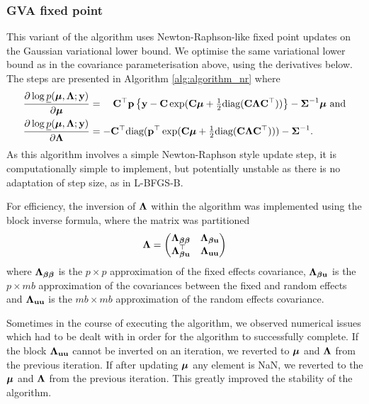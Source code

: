 	\subsubsection{GVA fixed point} 	%
	This variant of the algorithm uses Newton-Raphson-like fixed point updates on the Gaussian variational lower
	bound. We optimise the same variational lower bound as in the covariance parameterisation above, using the
	derivatives below. The steps are presented in Algorithm \ref{alg:algorithm_nr} where	
	\begin{align*}
		\frac{\partial \log \underline{p}({\boldsymbol \mu}, {\boldsymbol \Lambda}; {\bf y})}{\partial {\boldsymbol\mu}}     & = \quad {\bf C}^\top{\bf p} \left \{{\bf y} - {\bf C}\exp({\bf C} {\boldsymbol \mu} + \tfrac{1}{2} \text{diag}({\bf C} {\boldsymbol \Lambda} {\bf C}^\top)) \right \} - {\boldsymbol \Sigma}^{-1} {\boldsymbol \mu} \text{ and} \\
		\frac{\partial \log \underline{p}({\boldsymbol \mu}, {\boldsymbol \Lambda}; {\bf y})}{\partial {\boldsymbol\Lambda}} & = -{\bf C}^\top \text{diag}({\bf p}^\top \exp({\bf C} {\boldsymbol \mu} +\tfrac{1}{2} \text{diag}({\bf C} {\boldsymbol \Lambda} {\bf C}^\top))) - {\boldsymbol \Sigma}^{-1}.                             
	\end{align*}
	As this algorithm involves a simple Newton-Raphson style update step, it is computationally simple to
	implement, but potentially unstable as there is no adaptation of step size, as in L-BFGS-B.

	For efficiency, the inversion of ${\boldsymbol \Lambda}$ within the algorithm was implemented using the block inverse 
	formula, where	the matrix was partitioned
	\[
		{\boldsymbol \Lambda} =
		\begin{pmatrix}
			{\boldsymbol\Lambda}_{{\boldsymbol \beta} {\boldsymbol \beta}} & {\boldsymbol \Lambda}_{{\boldsymbol \beta} {\bf u}} \\
			{\boldsymbol \Lambda}_{{\boldsymbol \beta} {\bf u}}^\top & {\boldsymbol \Lambda}_{{\bf u} {\bf u}}
		\end{pmatrix}
	\]
	where ${\boldsymbol \Lambda}_{{\boldsymbol \beta} {\boldsymbol \beta}}$ is the $p \times p$ approximation of the fixed effects covariance, ${\boldsymbol \Lambda}_{{\boldsymbol \beta} {\bf u}}$ is the $p \times mb$
	approximation of the covariances between the fixed and random effects and ${\boldsymbol \Lambda}_{{\bf u} {\bf u}}$ is the $mb \times mb$
	approximation of the random effects covariance.

	Sometimes in the course of  executing the algorithm, we observed numerical issues which had to be dealt
	with in order for the algorithm to successfully complete. If the block ${\boldsymbol \Lambda}_{{\bf u} {\bf u}}$ cannot be inverted on an
	iteration, we reverted to ${\boldsymbol \mu}$ and ${\boldsymbol \Lambda}$ from the previous iteration. If after updating ${\boldsymbol \mu}$
	any element is NaN, we reverted to the ${\boldsymbol \mu}$ and ${\boldsymbol \Lambda}$ from the previous iteration. This greatly
	improved the stability of the algorithm.
	
